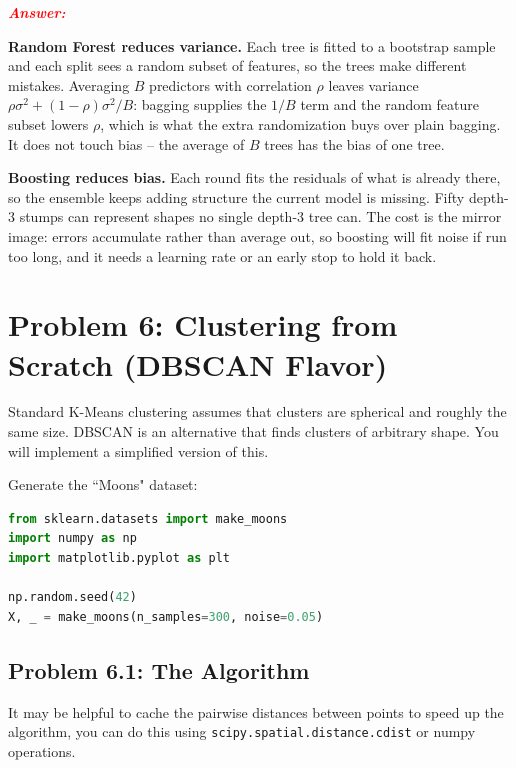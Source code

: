 \documentclass[11pt, letterpaper]{article}
\newcommand{\problem}[1]{\section*{Problem #1}}
\newcommand{\subproblem}[1]{\subsection*{Problem #1}}
\newcommand{\answer}{\textbf{\textit{\textcolor{red}{Answer:}}}}
\begin{document}
\answer

\textbf{Random Forest reduces variance.} Each tree is fitted to a bootstrap sample and each split
sees a random subset of features, so the trees make different mistakes. Averaging $B$ predictors
with correlation $\rho$ leaves variance $\rho\sigma^2 + (1-\rho)\sigma^2/B$: bagging supplies the
$1/B$ term and the random feature subset lowers $\rho$, which is what the extra randomization buys
over plain bagging. It does not touch bias -- the average of $B$ trees has the bias of one tree.

\textbf{Boosting reduces bias.} Each round fits the residuals of what is already there, so the
ensemble keeps adding structure the current model is missing. Fifty depth-3 stumps can represent
shapes no single depth-3 tree can. The cost is the mirror image: errors accumulate rather than
average out, so boosting will fit noise if run too long, and it needs a learning rate or an early
stop to hold it back.


\problem{6: Clustering from Scratch (DBSCAN Flavor)}

Standard K-Means clustering assumes that clusters are spherical and roughly the same size. 
DBSCAN is an alternative that finds clusters of arbitrary shape. You will implement a simplified version of this.

Generate the ``Moons" dataset:
    \begin{lstlisting}[language=Python]
from sklearn.datasets import make_moons
import numpy as np
import matplotlib.pyplot as plt

np.random.seed(42)
X, _ = make_moons(n_samples=300, noise=0.05)\end{lstlisting}

\subproblem{6.1: The Algorithm}
It may be helpful to cache the pairwise distances between points to speed up the algorithm,
you can do this using \texttt{scipy.spatial.distance.cdist} or numpy operations.
\end{document}
